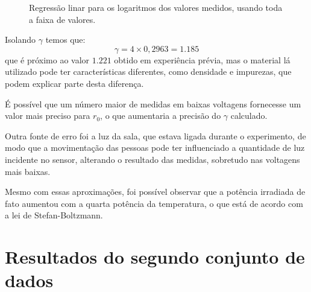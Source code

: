 \documentclass[brazilian,12pt,a4paper,final]{article}
\begin{document}
\begin{figure}[htbp!]
  \caption{Regressão linar para os logaritmos dos valores medidos, usando toda a faixa de valores.}
  \label{figfimgr}
  \centering
\end{figure}

Isolando $\gamma$ temos que:
$$\gamma=4\times 0,2963=1.185$$
que é próximo ao valor $1.221$ obtido em experiência prévia,
mas o material lá utilizado pode ter características diferentes,
como densidade e impurezas, que podem explicar parte desta diferença.

É possível que um número maior de medidas em baixas voltagens fornecesse
um valor mais preciso para $r_0$, o que aumentaria a precisão do $\gamma$
calculado.

Outra fonte de erro foi a luz da sala, que estava ligada durante o 
experimento, de modo que a movimentação das pessoas pode ter influenciado
a quantidade de luz incidente no sensor, 
alterando o resultado das medidas, sobretudo nas voltagens mais baixas.

Mesmo com essas aproximações, 
foi possível observar que a potência irradiada de fato aumentou
com a quarta potência da temperatura, 
o que está de acordo com a lei de Stefan-Boltzmann.

\section{Resultados do segundo conjunto de dados}
\end{document}
